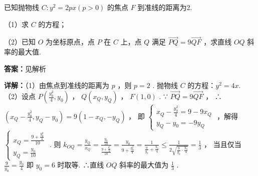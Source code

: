 \begin{question}[points=12]
已知抛物线 $C: y^2 = 2px (p>0)$ 的焦点 $F$ 到准线的距离为2.

（1）求 $C$ 的方程；

（2）已知 $O$ 为坐标原点，点 $P$ 在 $C$ 上，点 $Q$ 满足 $\overrightarrow{PQ} = 9\overrightarrow{QF}$ ，求直线 $OQ$ 斜率的最大值.
\begin{solution}
\textbf{答案：}见解析

\textbf{详解：}（1）由焦点到准线的距离为 $p$ ，则 $p = 2$ .
抛物线 $C$ 的方程：$y^2 = 4x$.
（2）设点 $P\left(\frac{y_0^2}{4}, y_0\right)$ ， $Q(x_Q, y_Q)$ ， $F(1,0)$ .
∵ $\overrightarrow{PQ} = 9\overrightarrow{QF}$ ，
∴ $(x_Q - \frac{y_0^2}{4}, y_Q - y_0) = 9(1-x_Q, -y_Q)$ ，
即 $\begin{cases} x_Q - \frac{y_0^2}{4} = 9 - 9x_Q \\ y_Q - y_0 = -9y_Q \end{cases}$ ，解得 $\begin{cases} x_Q = \frac{9 + \frac{y_0^2}{4}}{10} \\ y_Q = \frac{y_0}{10} \end{cases}$ .
则 $k_{OQ} = \frac{y_Q}{x_Q} = \frac{\frac{y_0}{10}}{\frac{9 + \frac{y_0^2}{4}}{10}} = \frac{y_0}{9 + \frac{y_0^2}{4}} = \frac{1}{\frac{9}{y_0} + \frac{y_0}{4}} \le \frac{1}{2\sqrt{\frac{9}{y_0}\cdot\frac{y_0}{4}}} = \frac{1}{3}$ ，
当且仅当 $\frac{9}{y_0} = \frac{y_0}{4}$ 即 $y_0 = 6$ 时取等.
∴直线 $OQ$ 斜率的最大值为 $\frac{1}{3}$ .
\end{solution}
\end{question}

